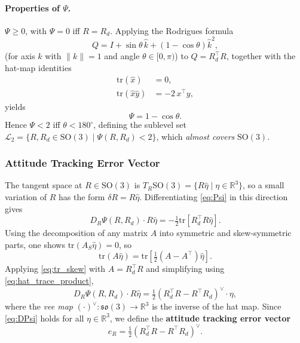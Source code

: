 \documentclass[11pt]{article}
\theoremstyle{remark}
\newcommand{\SO}{\mathrm{SO}(3)}
\newcommand{\so}{\mathfrak{so}(3)}
\newcommand{\R}{\mathbb{R}}
\newcommand{\tr}{\mathrm{tr}}
\newcommand{\hatmap}[1]{\widehat{#1}}
\begin{document}
\paragraph{Properties of $\Psi$.}
$\Psi \geq 0$, with $\Psi = 0$ iff $R = R_d$. Applying the Rodrigues formula
\begin{equation}
    Q = I + \sin\theta\,\hatmap{k} + (1-\cos\theta)\hatmap{k}^2,
    \label{eq:rodrigues}
\end{equation}
(for axis $k$ with $\|k\|=1$ and angle $\theta \in [0,\pi)$) to $Q = R_d^\top R$, together with the hat-map identities
\begin{align}
    \tr(\hatmap{x}) &= 0, \label{eq:hat_trace}\\
    \tr(\hatmap{x}\hatmap{y}) &= -2\,x^\top y, \label{eq:hat_trace_product}
\end{align}
yields
\begin{equation}
    \Psi = 1 - \cos\theta.
    \label{eq:Psi_cos}
\end{equation}
Hence $\Psi < 2$ iff $\theta < 180^\circ$, defining the sublevel set $\mathcal{L}_2 = \{R,R_d \in \SO \mid \Psi(R,R_d) < 2\}$, which \emph{almost covers} $\SO$.

\subsubsection{Attitude Tracking Error Vector}
The tangent space at $R \in \SO$ is $T_R\SO = \{R\hatmap{\eta} \mid \eta \in \R^3\}$, so a small variation of $R$ has the form $\delta R = R\hatmap{\eta}$. Differentiating \eqref{eq:Psi} in this direction gives
\[
D_R\Psi(R, R_d) \cdot R\hatmap{\eta}
= -\tfrac{1}{2}\tr\!\left[R_d^\top R\hatmap{\eta}\right].
\]
Using the decomposition of any matrix $A$ into symmetric and skew-symmetric parts, one shows $\tr(A_S\hatmap{\eta}) = 0$, so
\begin{equation}
\tr(A\hatmap{\eta}) = \tr\!\left[\tfrac{1}{2}(A - A^\top)\hatmap{\eta}\right].
\label{eq:tr_skew}
\end{equation}
Applying \eqref{eq:tr_skew} with $A = R_d^\top R$ and simplifying using \eqref{eq:hat_trace_product},
\begin{equation}
D_R \Psi(R, R_d) \cdot R\hatmap{\eta} = \tfrac{1}{2}(R_d^\top R - R^\top R_d)^\vee \cdot \eta,
\label{eq:DPsi}
\end{equation}
where the \emph{vee map} $(\cdot)^\vee : \so \to \R^3$ is the inverse of the hat map. Since \eqref{eq:DPsi} holds for all $\eta \in \R^3$, we define the \textbf{attitude tracking error vector}
\begin{equation}
e_R = \tfrac{1}{2}(R_d^\top R - R^\top R_d)^\vee.
\label{eq:eR}
\end{equation}
\end{document}
